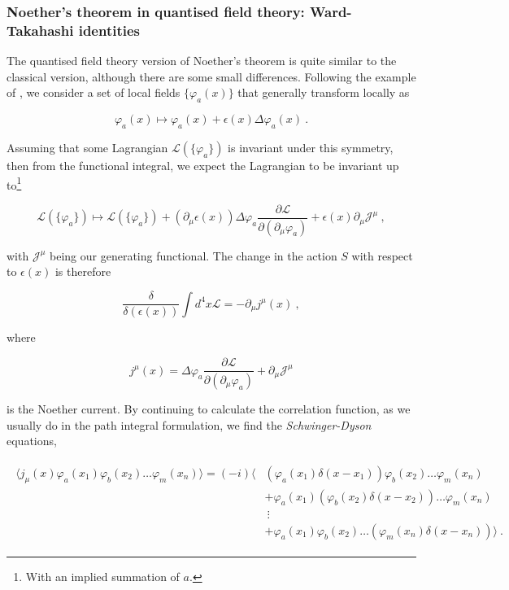 \documentclass[10pt,twoside]{report}
\begin{document}
	\subsubsection{Noether's theorem in quantised field theory: Ward-Takahashi identities}
	The quantised field theory version of Noether's theorem is quite similar to the classical version, although there are some small differences. Following the example of \cite{PeskinSchroeder}, we consider a set of local fields $\{\varphi_a(x)\}$ that generally transform locally as
	
	\begin{equation}
		\varphi_a(x) \mapsto \varphi_a(x) + \epsilon(x)\Delta\varphi_a(x)\:.
	\end{equation}
	
	Assuming that some Lagrangian $\mathcal{L}(\{\varphi_a\})$ is invariant under this symmetry, then from the functional integral, we expect the Lagrangian to be invariant up to\footnote{With an implied summation of $a$.}
	
	\begin{equation}
		\mathcal{L}(\{\varphi_a\}) \mapsto \mathcal{L}(\{\varphi_a\}) + (\partial_ \mu\epsilon(x))\Delta\varphi_a \frac{\partial\mathcal{L}}{\partial(\partial_ \mu\varphi_a)} + \epsilon(x)\partial_\mu\mathcal{J}^\mu\:,
	\end{equation}
	
	\noindent with $\mathcal{J}^\mu$ being our generating functional. The change in the action $S$ with respect to $\epsilon(x)$ is therefore
	
	\begin{equation}
		\frac{\delta}{\delta(\epsilon(x))}\int d^4x \mathcal{L} = -\partial_\mu j^\mu(x)\:,
	\end{equation}
	
	\noindent where
	
	\begin{equation}
		j^\mu(x) = \Delta\varphi_a \frac{\partial\mathcal{L}}{\partial(\partial_ \mu\varphi_a)} + \partial_\mu\mathcal{J}^\mu
	\end{equation}
	
	\noindent is the Noether current. By continuing to calculate the correlation function, as we usually do in the path integral formulation, we find \cite{PeskinSchroeder} the \emph{Schwinger-Dyson} equations,
	
	\begin{align}
		\begin{split}
		\langle j_\mu(x)\varphi_a(x_1)\varphi_b(x_2)\ldots\varphi_m(x_n)\rangle = (-i)\big\langle &(\varphi_a(x_1)\delta(x-x_1))\varphi_b(x_2)\ldots\varphi_m(x_n) \\
		&+\varphi_a(x_1)(\varphi_b(x_2)\delta(x-x_2))\ldots\varphi_m(x_n) \\
		&\:\vdots\\
		&+\varphi_a(x_1)\varphi_b(x_2)\ldots(\varphi_m(x_n)\delta(x-x_n))\big\rangle\:.
		\end{split}
	\end{align}
	
\end{document}
